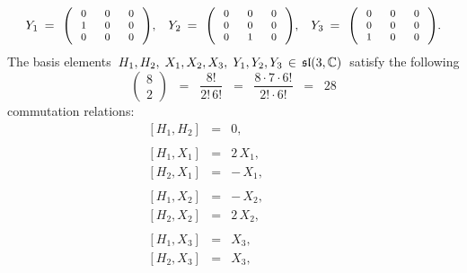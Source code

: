 \begin{lemma}
\begin{equation*}
\begin{array}{ccccccccc}
Y_{1}
\!\!\!
&=&
    \!\!
    {\footnotesize\left(\,
        \begin{array}{rrr} 0 & {\color{white}..}0 & {\color{white}..}0 \\ 1 & 0 & 0 \\ 0 & 0 & 0 \end{array}
        \,\right)},
&
Y_{2}
\!\!\!
&=&
    \!\!
    {\footnotesize\left(\,
        \begin{array}{rrr} 0 & {\color{white}..}0 & {\color{white}..}0 \\ 0 & 0 & 0 \\ 0 & 1 & 0 \end{array}
        \,\right)},
&
Y_{3}
\!\!\!
&=&
    \!\!
    {\footnotesize\left(\,
        \begin{array}{rrr} 0 & {\color{white}..}0 & {\color{white}..}0 \\ 0 & 0 & 0 \\ 1 & 0 & 0 \end{array}
        \,\right)}.
\end{array}
\end{equation*}
The basis elements
\,$H_{1},H_{2},\; X_{1},X_{2},X_{3},\; Y_{1},Y_{2},Y_{3} \,\in\, \mathfrak{sl}(3,\mathbb{C})$\,
satisfy the following
\begin{equation*}
\left(\!\begin{array}{c} 8 \\ 2 \end{array}\!\right)
\;\; = \;\;
    \dfrac{8!}{2!\,6!}
\;\; = \;\;
    \dfrac{8 \cdot 7 \cdot 6!}{2! \cdot 6!}
\;\; = \;\;
    28
\end{equation*}
commutation relations:
\begin{equation*}
\begin{array}{ccr}
\left[H_{1},H_{2}\right] &=& 0,
\\ \\
\left[H_{1},X_{1}\right] &=& 2\,X_{1},
\\
\left[H_{2},X_{1}\right] &=& -\,X_{1},
\\ \\
\left[H_{1},X_{2}\right] &=& -\,X_{2},
\\
\left[H_{2},X_{2}\right] &=& 2\,X_{2},
\\ \\
\left[H_{1},X_{3}\right] &=& X_{3},
\\
\left[H_{2},X_{3}\right] &=& X_{3},
\end{array}
\quad\quad
\begin{array}{ccr}
&&
\\ \\

\end{array}
\end{equation*}
\end{lemma}
